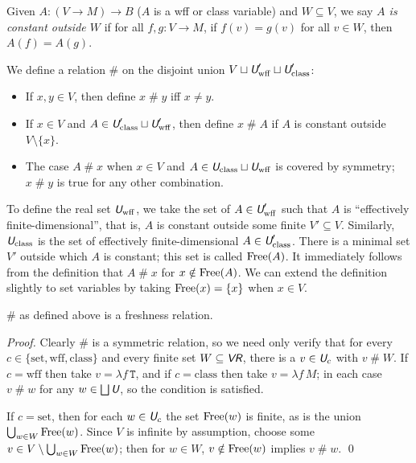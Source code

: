 \documentclass[runningheads,a4paper]{llncs}
\newcommand{\vr}{\textit{\textsf{VR}}} %
\newcommand{\uv}{\textit{\textsf{U}}} %
\newcommand{\fresh}{\mathbin{\#}}
\newcommand{\tT}{\texttt{T}}
\begin{document}
\begin{definition}
Given $A:(V\to M)\to B$ ($A$ is a wff or class variable) and $W\subseteq V$, we say {\em $A$ is constant outside $W$} if for all $f,g:V\to M$, if $f(v)=g(v)$ for all $v\in W$, then $A(f)=A(g)$.
\end{definition}

We define a relation $\fresh$ on the disjoint union $V\sqcup\uv'_\mathrm{wff}\sqcup\uv'_\mathrm{class}$:
\begin{itemize}
  \item If $x,y\in V$, then define $x\fresh y$ iff $x\ne y$.
  \item If $x\in V$ and $A\in\uv'_\mathrm{class}\sqcup\uv'_\mathrm{wff}$, then define $x\fresh A$ if $A$ is constant outside $V\setminus\{x\}$.
  \item The case $A\fresh x$ when $x\in V$ and $A\in\uv_\mathrm{class}\sqcup\uv_\mathrm{wff}$ is covered by symmetry; $x\fresh y$ is true for any other combination.
\end{itemize}

To define the real set $\uv_\mathrm{wff}$, we take the set of $A\in\uv'_\mathrm{wff}$ such that $A$ is ``effectively finite-dimensional'', that is, $A$ is constant outside some finite $V'\subseteq V$. Similarly, $\uv_\mathrm{class}$ is the set of effectively finite-dimensional $A\in\uv'_\mathrm{class}$. There is a minimal set $V'$ outside which $A$ is constant; this set is called ${\rm Free}(A)$. It immediately follows from the definition that $A\fresh x$ for $x\notin{\rm Free}(A)$. We can extend the definition slightly to set variables by taking ${\rm Free}(x)=\{x\}$ when $x\in V$.

\begin{theorem}\label{thm:fresh}
$\fresh$ as defined above is a freshness relation.
\end{theorem}
\begin{proof}
Clearly $\fresh$ is a symmetric relation, so we need only verify that for every $c\in\{\mathrm{set},\mathrm{wff},\mathrm{class}\}$ and every finite set $W\subseteq\vr$, there is a $v\in\uv_c$ with $v\fresh W$. If $c=\mathrm{wff}$ then take $v=\lambda f\,\tT$, and if $c=\mathrm{class}$ then take $v=\lambda f\,M$; in each case $v\fresh w$ for any $w\in\bigsqcup\uv$, so the condition is satisfied.

If $c=\mathrm{set}$, then for each $w\in\uv_c$ the set ${\rm Free}(w)$ is finite, as is the union $\bigcup_{w\in W}{\rm Free}(w)$. Since $V$ is infinite by assumption, choose some $v\in\\ V\setminus\bigcup_{w\in W}{\rm Free}(w)$; then for $w\in W$, $v\notin{\rm Free}(w)$ implies $v\fresh w$.
\qed\end{proof}
\end{document}
